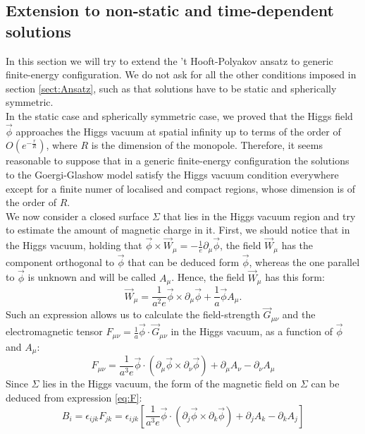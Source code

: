 \documentclass[main.tex]{subfiles}
\begin{document}
\subsection{Extension to non-static and time-dependent solutions}
\label{sect:top}
In this section we will try to extend the 't Hooft-Polyakov ansatz to generic finite-energy configuration. We do not ask for all the other conditions imposed in section \ref{sect:Ansatz}, such as that solutions have to be static and spherically symmetric. \\
In the static case and spherically symmetric case, we proved that the Higgs field $\vec{\phi}$ approaches the Higgs vacuum at spatial infinity up to terms of the order of $O(e^{-\frac{r}{R}})$, where $R$ is the dimension of the monopole.
Therefore, it seems reasonable to suppose that in a generic finite-energy configuration the solutions to the Goergi-Glashow model satisfy the Higgs vacuum condition everywhere except for a finite numer of localised and compact regions, whose dimension is of the order of $R$.\\
We now consider a closed surface $\Sigma$ that lies in the Higgs vacuum region and try to estimate the amount of magnetic charge in it. 
First, we should notice that in the Higgs vacuum, holding that $ \vec{\phi} \times \vec{W}_\mu = - \frac{1}{e} \partial_\mu \vec{\phi}$, the field $\vec{W}_\mu $ has the component orthogonal to $\vec{\phi}$ that can be deduced form $\vec{\phi}$, whereas the one parallel to $\vec{\phi}$ is unknown and will be called $A_\mu$. Hence, the field $\vec{W}_{\mu}$ has this form: 
\begin{equation}
\vec{W}_{\mu} = \frac{1}{a^2 e} \vec{\phi} \times \partial_\mu \vec{\phi} + \frac{1}{a}\vec{\phi} A_\mu . 
\end{equation}
Such an expression allows us to calculate the field-strength $\vec{G}_{\mu \nu}$ and the electromagnetic tensor $F_{\mu \nu} = \frac{1}{a} \vec{\phi}\cdot \vec{G}_{\mu \nu}$ in the Higgs vacuum, as a function of $\vec{\phi}$ and $A_\mu$: 
\begin{equation}
F_{\mu \nu}  = \frac{1}{a^3 e}\vec{\phi}\cdot \left(  \partial_\mu \vec{\phi}  \times  \partial_\nu \vec{\phi} \right) + \partial_\mu A_\nu -\partial_\nu A_\mu
\label{eq:F}
\end{equation}
Since $\Sigma $ lies in the Higgs vacuum, the form of the magnetic field on $\Sigma$ can be deduced from expression \ref{eq:F}:
\begin{equation}
B_i = \epsilon_{ijk} F_{jk} =   \epsilon_{ijk} \left[ \frac{1}{a^3 e} \vec{\phi}\cdot \left(  \partial_j \vec{\phi}  \times  \partial_k \vec{\phi} \right) + \partial_j A_k -\partial_k A_j \right]
\end{equation}
\end{document}
